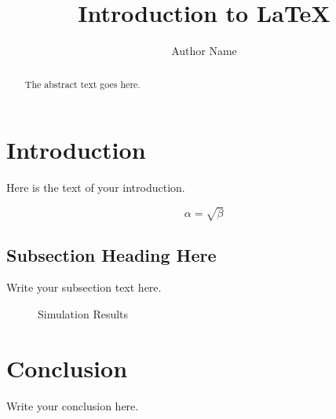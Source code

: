 \documentclass{article}
\begin{document}
\title{Introduction to \LaTeX }
\author{Author Name}

\maketitle

\begin{abstract}
The abstract text goes here.
\end{abstract}

\section{Introduction}
Here is the text of your introduction.

\begin{equation}
    \label{simple_equation}
    \alpha = \sqrt{ \beta }
\end{equation}

\subsection{Subsection Heading Here}
Write your subsection text here.

\begin{figure}
    \centering
    \caption{Simulation Results}
    \label{simulationfigure}
\end{figure}

\section{Conclusion}
Write your conclusion here.
\end{document}
